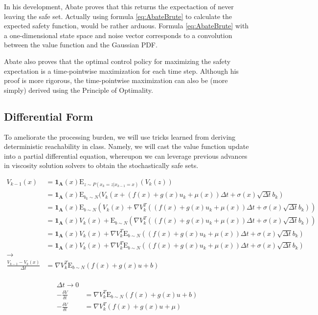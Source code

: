 \documentclass[a4paper]{article}
\begin{document}
In his development, Abate proves that this returns the expectaction of never leaving the safe set.
Actually using formula \ref{eq:AbateBrute} to calculate the expected safety function, would be rather arduous.
Formula \ref{eq:AbateBrute} with a one-dimensional state space and noise vector corresponds to a convolution between the value function and the Gaussian PDF.

Abate also proves that the optimal control policy for maximizing the safety expectation is a time-pointwise maximization for each time step.
Although his proof is more rigorous, the time-pointwise maximization can also be (more simply) derived using the Principle of Optimality.

\subsection{Differential Form}
To ameliorate the processing burden, we will use tricks learned from deriving deterministic reachability in class.
Namely, we will cast the value function update into a partial differential equation, whereupon we can leverage previous advances in viscosity solution solvers to obtain the stochastically safe sets.

\begin{align}
V_{k-1}(x) & = \mathbf{1_A}(x) \mathrm{E}_{z \sim P(x_k = z | x_{k-1}=x)} (V_k(z))
\\ & = \mathbf{1_A}(x) \mathrm{E}_{b_k\sim N} (V_k( x + (f(x) + g(x) u_k + \mu(x)) \Delta t + \sigma(x) \sqrt{\Delta t} b_k )
\\ & = \mathbf{1_A}(x) \mathrm{E}_{b\sim N} (V_k( x ) + \nabla V_k^T ((f(x) + g(x) u_k + \mu(x)) \Delta t + \sigma(x) \sqrt{\Delta t} b_k) )
\\ & = \mathbf{1_A}(x) V_k(x) + \mathrm{E}_{b\sim N} ( \nabla V_k^T ( (f(x) + g(x) u_k + \mu(x)) \Delta t + \sigma(x) \sqrt{\Delta t} b_k)  )
\\ & = \mathbf{1_A}(x) V_k(x) + \nabla V_k^T \mathrm{E}_{b\sim N}   ( (f(x) + g(x) u_k + \mu(x)) \Delta t + \sigma(x) \sqrt{\Delta t} b_k)
\\ & = \mathbf{1_A}(x) V_k(x) + \nabla V_k^T \mathrm{E}_{b\sim N}   ( (f(x) + g(x) u_k + \mu(x)) \Delta t + \sigma(x) \sqrt{\Delta t} b_k)
\\ \rightarrow
\\ \frac{V_{k-1} - V_k(x)}{\Delta t} &= \nabla V_k^T \mathrm{E}_{b\sim N} ( f(x) + g(x) u + b )
\end{align}

\begin{align}
\\ \Delta t \rightarrow 0
\\ -\frac{\delta V}{\delta t} &= \nabla V_k^T \mathrm{E}_{b\sim N} ( f(x) + g(x) u + b )
\\ -\frac{\delta V}{\delta t} &= \nabla V_k^T ( f(x) + g(x) u + \mu )
\end{align}
\end{document}
